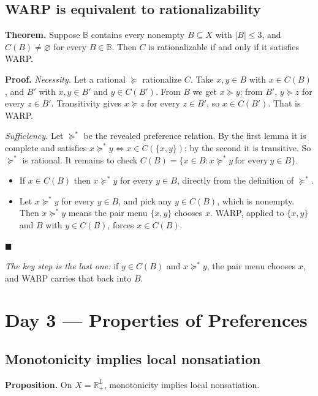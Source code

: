 \documentclass[11pt,a4paper]{article}
\newcommand{\slideref}[1]{\par\vspace{-.3em}{\small\itshape Supports: #1.}\par\vspace{.55em}}
\newcommand{\done}{\hfill$\blacksquare$}
\begin{document}
\subsection{WARP is equivalent to rationalizability}
\slideref{``WARP and Rationalizability''}
\textbf{Theorem.} Suppose $\mathbb B$ contains every nonempty $B\subseteq X$
with $|B|\leq 3$, and $C(B)\neq\varnothing$ for every $B\in\mathbb B$. Then $C$
is rationalizable if and only if it satisfies WARP.

\noindent\textbf{Proof.}
\emph{Necessity.} Let a rational $\succeq$ rationalize $C$. Take $x,y\in B$
with $x\in C(B)$, and $B'$ with $x,y\in B'$ and $y\in C(B')$. From $B$ we get
$x\succeq y$; from $B'$, $y\succeq z$ for every $z\in B'$. Transitivity gives
$x\succeq z$ for every $z\in B'$, so $x\in C(B')$. That is WARP.

\noindent
\emph{Sufficiency.} Let $\succeq^*$ be the revealed preference relation. By the
first lemma it is complete and satisfies $x\succeq^*y\iff x\in C(\{x,y\})$; by
the second it is transitive. So $\succeq^*$ is rational. It remains to check
$C(B)=\{x\in B:x\succeq^* y\ \text{for every}\ y\in B\}$.
\begin{itemize}[nosep,leftmargin=2.2em]
  \item[$\subseteq$] If $x\in C(B)$ then $x\succeq^* y$ for every $y\in B$,
  directly from the definition of $\succeq^*$.
  \item[$\supseteq$] Let $x\succeq^* y$ for every $y\in B$, and pick any
  $y\in C(B)$, which is nonempty. Then $x\succeq^* y$ means the pair menu
  $\{x,y\}$ chooses $x$. WARP, applied to $\{x,y\}$ and $B$ with $y\in C(B)$,
  forces $x\in C(B)$.
\end{itemize}
\done

\noindent
\emph{The key step is the last one:} if $y\in C(B)$ and $x\succeq^* y$, the
pair menu chooses $x$, and WARP carries that back into $B$.

\section{Day 3 --- Properties of Preferences}

\subsection{Monotonicity implies local nonsatiation}
\slideref{``Monotonicity and Local Nonsatiation''}
\textbf{Proposition.} On $X=\mathbb{R}_+^L$, monotonicity implies local
nonsatiation.
\end{document}
